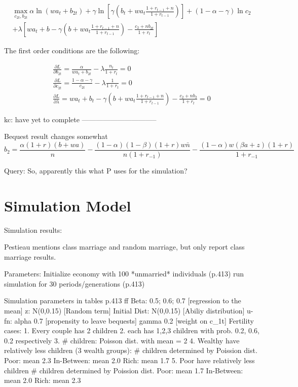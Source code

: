 \documentclass{article}
\begin{document}
\begin{gather*}
\max_{c_{2t}, b_{2t}} \alpha \ln (w a_{t} + b_{2t})
+ \gamma \ln [ \gamma(b_t+w a_{t} \frac{1+r_{t-1}+n}{1+r_{t-1}}) ]
+ (1-\alpha-\gamma) \ln c_{2}\\
+ \lambda [ w a_t + b - \gamma(b+w a_t \frac{1+r_{t-1}+n}{1+r_{t-1}} ) - \frac{c_{2} + n b_{2t}}{1+r_t}]
\end{gather*}

The first order conditions are the following:

\begin{eqnarray}
\frac{\partial L}{\partial b_{2t}} = \frac{\alpha}{w a_t + b_{2t}} - \lambda \frac{n_t}{1+r_t} = 0\\
\frac{\partial L}{\partial c_{2t}} = \frac{1-\alpha-\gamma}{c_{2t}}-\lambda\frac{1}{1+r_t} = 0\\
\frac{\partial L}{\partial \lambda} = w a_t + b_t - \gamma(b+w a_t \frac{1+r_{t-1}+n}{1+r_{t-1}} ) - \frac{c_{2} + n b_{2}}{1+r_t} = 0
\end{eqnarray}

kc: have yet to complete\newline
--------------------------------


Bequest result changes somewhat
\begin{equation}
b_{2} =
\frac{\alpha(1+r)(b+wa)}{n}
- \frac{(1-\alpha)(1-\beta)(1+r)w\bar{n}}{n(1+r_{-1})}
- \frac{(1-\alpha)w(\beta a + z)(1+r)}{1+r_{-1}}
\label{Pestieau11p} \tag{Pestieau 11'}
\end{equation}

Query: So, apparently this what P uses for the simulation?



\section{Simulation Model}

Simulation results:

Pestieau mentions class marriage and random marriage,
but only report class marriage results.

\begin{verbatimtab}
Parameters:
	Initialize economy with 100 *unmarried* individuals (p.413)
	run simulation for 30 periods/generations (p.413)

Simulation parameters in tables p.413 ff
	Beta:			0.5; 0.6; 0.7	[regression to the mean]
	z: 				N(0,0.15)		[Random term]
	Initial Dist:	N(0,0.15)		[Abiliy distribution]
	u-fn:	alpha	0.7				[propensity to leave bequests]
			gamma	0.2				[weight on c_1t]
	Fertility cases:
		1. Every couple has 2 children
		2. each has 1,2,3 children with prob. 0.2, 0.6, 0.2 respectively
		3. # children: Poisson dist. with mean = 2
		4. Wealthy have relatively less children (3 wealth groups):
			# children determined by Poission dist.
			Poor: 		mean 2.3
			In-Between: mean 2.0
			Rich:		mean 1.7
		5. Poor have relatively less children
			# children determined by Poission dist.
			Poor:		mean 1.7
			In-Between:	mean 2.0
			Rich:		mean 2.3
\end{verbatimtab}
\end{document}
